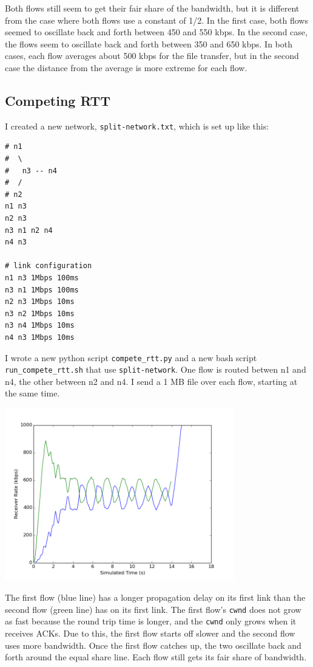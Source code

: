 \documentclass[11pt]{article}
\newcommand{\code}[1]{\texttt{#1}}
\begin{document}
Both flows still seem to get their fair share of the bandwidth, but it is different from the case where both flows use a constant of 1/2. In the first case, both flows seemed to oscillate back and forth between 450 and 550 kbps. In the second case, the flows seem to oscillate back and forth between 350 and 650 kbps. In both cases, each flow averages about 500 kbps for the file transfer, but in the second case the distance from the average is more extreme for each flow.

\subsection{Competing RTT}

I created a new network, \code{split-network.txt}, which is set up like this:
\begin{lstlisting}
# n1
#  \
#   n3 -- n4
#  /
# n2
n1 n3
n2 n3
n3 n1 n2 n4
n4 n3

# link configuration
n1 n3 1Mbps 100ms
n3 n1 1Mbps 100ms
n2 n3 1Mbps 10ms
n3 n2 1Mbps 10ms
n3 n4 1Mbps 10ms
n4 n3 1Mbps 10ms
\end{lstlisting}

I wrote a new python script \code{compete\_rtt.py} and a new bash script \code{run\_compete\_rtt.sh} that use \code{split-network}. One flow is routed betwen n1 and n4, the other between n2 and n4. I send a 1 MB file over each flow, starting at the same time.

\includegraphics[width=10cm]{../graphs/compete_receiver_rate.png}

The first flow (blue line) has a longer propagation delay on its first link than the second flow (green line) has on its first link. The first flow's \code{cwnd} does not grow as fast because the round trip time is longer, and the \code{cwnd} only grows when it receives ACKs. Due to this, the first flow starts off slower and the second flow uses more bandwidth. Once the first flow catches up, the two oscillate back and forth around the equal share line. Each flow still gets its fair share of bandwidth.
\end{document}
